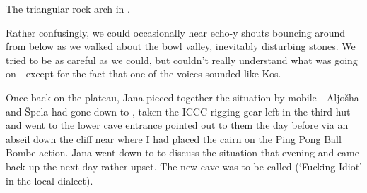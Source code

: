 \begin{marginfigure}
      \checkoddpage \ifoddpage \forcerectofloat \else \forceversofloat \fi
      \centering
  \caption{The triangular rock arch in . }
\end{marginfigure}

Rather confusingly, we could occasionally hear echo-y shouts bouncing
around from below as we walked about the bowl valley, inevitably
disturbing stones. We tried to be as careful as we could, but couldn't
really understand what was going on - except for the fact that one of
the voices sounded like Kos.

Once back on the plateau, Jana pieced together the situation by mobile -
Aljošha and Špela had gone down to , taken the ICCC rigging gear
left in the third hut and went to the lower cave entrance pointed out to
them the day before via an abseil down the cliff near 
where I had placed the cairn on the Ping Pong Ball Bombe action. Jana
went down to  to discuss the situation that evening and came back up
the next day rather upset. The new cave was to be called 
(`Fucking Idiot' in the local dialect).


